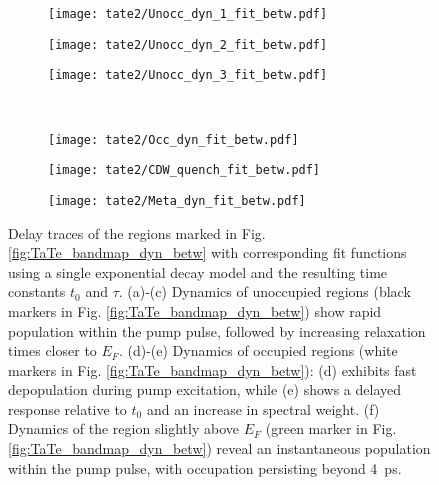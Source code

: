 \begin{figure}[t]
	\centering
	\begin{subfigure}[b]{0.33\textwidth}
		\texttt{[image: tate2/Unocc\_dyn\_1\_fit\_betw.pdf]}
		\caption{}
	\end{subfigure}
	\hfill
	\begin{subfigure}[b]{0.33\textwidth}
		\texttt{[image: tate2/Unocc\_dyn\_2\_fit\_betw.pdf]}
		\caption{}
	\end{subfigure}
	\hfill
	\begin{subfigure}[b]{0.33\textwidth}
		\texttt{[image: tate2/Unocc\_dyn\_3\_fit\_betw.pdf]}
		\caption{}
	\end{subfigure}
	\\
	\begin{subfigure}[b]{0.33\textwidth}
		\texttt{[image: tate2/Occ\_dyn\_fit\_betw.pdf]}
		\caption{}
	\end{subfigure}
	\hfill
	\begin{subfigure}[b]{0.33\textwidth}
		\texttt{[image: tate2/CDW\_quench\_fit\_betw.pdf]}
		\caption{}
	\end{subfigure}
	\hfill
	\begin{subfigure}[b]{0.33\textwidth}
		\texttt{[image: tate2/Meta\_dyn\_fit\_betw.pdf]}
		\caption{}
	\end{subfigure}
	\caption{Delay traces of the regions marked in Fig. \ref{fig:TaTe_bandmap_dyn_betw} with corresponding fit functions using a single exponential decay model and the resulting time constants $t_0$ and $\tau$. (a)-(c) Dynamics of unoccupied regions (black markers in Fig. \ref{fig:TaTe_bandmap_dyn_betw}) show rapid population within the pump pulse, followed by increasing relaxation times closer to $E_F$. (d)-(e) Dynamics of occupied regions (white markers in Fig. \ref{fig:TaTe_bandmap_dyn_betw}): (d) exhibits fast depopulation during pump excitation, while (e) shows a delayed response relative to $t_0$ and an increase in spectral weight. (f) Dynamics of the region slightly above $E_F$ (green marker in Fig. \ref{fig:TaTe_bandmap_dyn_betw}) reveal an instantaneous population within the pump pulse, with occupation persisting beyond \qty{4}{\pico\second}.}
	\label{fig:TaTe_dyn_betw}
\end{figure}

